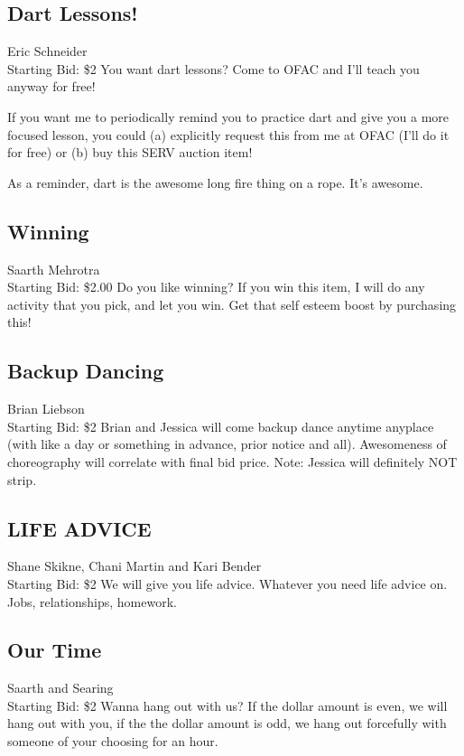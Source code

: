 \documentclass[11pt]{article}
\begin{document}
\subsection{Dart Lessons!}
Eric Schneider
\\
Starting Bid: \$2
\newline
You want dart lessons? Come to OFAC and I'll teach you anyway for free!

If you want me to periodically remind you to practice dart and give you a more focused lesson, you could (a) explicitly request this from me at OFAC (I'll do it for free) or (b) buy this SERV auction item!

As a reminder, dart is the awesome long fire thing on a rope. It's awesome.
\subsection{Winning}
Saarth Mehrotra
\\
Starting Bid: \$2.00
\newline
Do you like winning? If you win this item, I will do any activity that you pick, and let you win. Get that self esteem boost by purchasing this!
\subsection{Backup Dancing}
Brian Liebson
\\
Starting Bid: \$2
\newline
Brian and Jessica will come backup dance anytime anyplace (with like a day or something in advance, prior notice and all). Awesomeness of choreography will correlate with final bid price. Note: Jessica will definitely NOT strip.
\subsection{LIFE ADVICE}
Shane Skikne, Chani  Martin and Kari Bender
\\
Starting Bid: \$2
\newline
We will give you life advice. Whatever you need life advice on. Jobs, relationships, homework.
\subsection{Our Time}
Saarth and Searing
\\
Starting Bid: \$2
\newline
Wanna hang out with us? If the dollar amount is even, we will hang out with you, if the the dollar amount is odd, we hang out forcefully with someone of your choosing for an hour.
\end{document}
